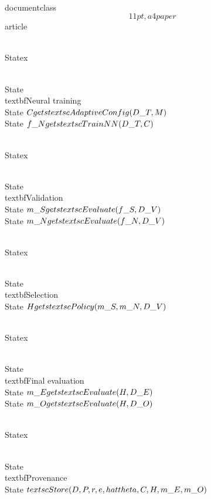 \\documentclass\[11pt,a4paper\]{article}
\begin{document}
 \\Statex

 \\State \\textbf{Neural training}\
 \\State $C\\gets\\textsc{AdaptiveConfig}(D\_T,M)$\
 \\State $f\_N\\gets\\textsc{TrainNN}(D\_T,C)$

 \\Statex

 \\State \\textbf{Validation}\
 \\State $m\_S\\gets\\textsc{Evaluate}(f\_S,D\_V)$\
 \\State $m\_N\\gets\\textsc{Evaluate}(f\_N,D\_V)$

 \\Statex

 \\State \\textbf{Selection}\
 \\State $H\\gets\
 \\textsc{Policy}(m\_S,m\_N,D\_V)$

 \\Statex

 \\State \\textbf{Final evaluation}\
 \\State $m\_E\\gets\\textsc{Evaluate}(H,D\_E)$\
 \\State $m\_O\\gets\\textsc{Evaluate}(H,D\_O)$

 \\Statex

 \\State \\textbf{Provenance}\
 \\State $\\textsc{Store}(D,P,r,e,\\hat{\\theta},C,H,m\_E,m\_O)$
\end{document}
